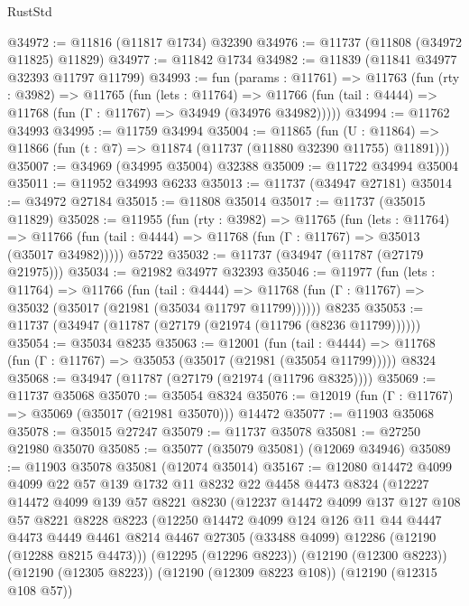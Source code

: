 \begin{lexlean}{RustStd}
\begin{coremodule}
@34972 := @11816 (@11817 @1734) @32390
@34976 := @11737 (@11808 (@34972 @11825) @11829)
@34977 := @11842 @1734
@34982 := @11839 (@11841 @34977 @32393 @11797 @11799)
@34993 := fun (params : @11761) =>
  @11763
    (fun (rty : @3982) =>
    @11765
      (fun (lets : @11764) =>
      @11766 (fun (tail : @4444) => @11768 (fun (Γ : @11767) => @34949 (@34976 @34982)))))
@34994 := @11762 @34993
@34995 := @11759 @34994
@35004 := @11865
    (fun (U : @11864) => @11866 (fun (t : @7) => @11874 (@11737 (@11880 @32390 @11755) @11891)))
@35007 := @34969 (@34995 @35004) @32388
@35009 := @11722 @34994 @35004
@35011 := @11952 @34993 @6233
@35013 := @11737 (@34947 @27181)
@35014 := @34972 @27184
@35015 := @11808 @35014
@35017 := @11737 (@35015 @11829)
@35028 := @11955
    (fun (rty : @3982) =>
    @11765
      (fun (lets : @11764) =>
      @11766 (fun (tail : @4444) => @11768 (fun (Γ : @11767) => @35013 (@35017 @34982)))))
    @5722
@35032 := @11737 (@34947 (@11787 (@27179 @21975)))
@35034 := @21982 @34977 @32393
@35046 := @11977
    (fun (lets : @11764) =>
    @11766
      (fun (tail : @4444) =>
      @11768 (fun (Γ : @11767) => @35032 (@35017 (@21981 (@35034 @11797 @11799))))))
    @8235
@35053 := @11737 (@34947 (@11787 (@27179 (@21974 (@11796 (@8236 @11799))))))
@35054 := @35034 @8235
@35063 := @12001
    (fun (tail : @4444) => @11768 (fun (Γ : @11767) => @35053 (@35017 (@21981 (@35054 @11799)))))
    @8324
@35068 := @34947 (@11787 (@27179 (@21974 (@11796 @8325))))
@35069 := @11737 @35068
@35070 := @35054 @8324
@35076 := @12019 (fun (Γ : @11767) => @35069 (@35017 (@21981 @35070))) @14472
@35077 := @11903 @35068
@35078 := @35015 @27247
@35079 := @11737 @35078
@35081 := @27250 @21980 @35070
@35085 := @35077 (@35079 @35081) (@12069 @34946)
@35089 := @11903 @35078 @35081 (@12074 @35014)
@35167 := @12080
    @14472
    @4099
    @4099
    @22
    @57
    @139
    @1732
    @11
    @8232
    @22
    @4458
    @4473
    @8324
    (@12227
      @14472
      @4099
      @139
      @57
      @8221
      @8230
      (@12237
        @14472
        @4099
        @137
        @127
        @108
        @57
        @8221
        @8228
        @8223
        (@12250
          @14472
          @4099
          @124
          @126
          @11
          @44
          @4447
          @4473
          @4449
          @4461
          @8214
          @4467
          @27305
          (@33488 @4099)
          @12286
          (@12190 (@12288 @8215 @4473)))
        (@12295 (@12296 @8223))
        (@12190 (@12300 @8223))
        (@12190 (@12305 @8223))
        (@12190 (@12309 @8223 @108))
        (@12190 (@12315 @108 @57))

\end{coremodule}
\end{lexlean}
